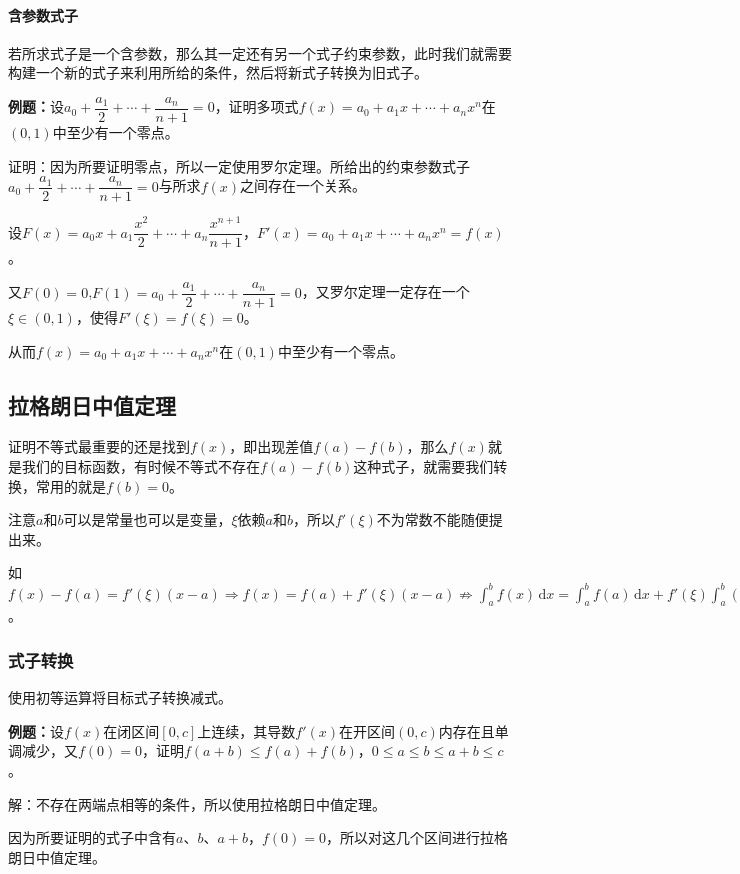 \documentclass[UTF8, 12pt]{ctexart}
\begin{document}
\paragraph{含参数式子} \leavevmode \medskip

若所求式子是一个含参数，那么其一定还有另一个式子约束参数，此时我们就需要构建一个新的式子来利用所给的条件，然后将新式子转换为旧式子。

\textbf{例题：}设$a_0+\dfrac{a_1}{2}+\cdots+\dfrac{a_n}{n+1}=0$，证明多项式$f(x)=a_0+a_1x+\cdots+a_nx^n$在$(0,1)$中至少有一个零点。

证明：因为所要证明零点，所以一定使用罗尔定理。所给出的约束参数式子$a_0+\dfrac{a_1}{2}+\cdots+\dfrac{a_n}{n+1}=0$与所求$f(x)$之间存在一个关系。

设$F(x)=a_0x+a_1\dfrac{x^2}{2}+\cdots+a_n\dfrac{x^{n+1}}{n+1}$，$F'(x)=a_0+a_1x+\cdots+a_nx^n=f(x)$。

又$F(0)=0$,$F(1)=a_0+\dfrac{a_1}{2}+\cdots+\dfrac{a_n}{n+1}=0$，又罗尔定理一定存在一个$\xi\in(0,1)$，使得$F'(\xi)=f(\xi)=0$。

从而$f(x)=a_0+a_1x+\cdots+a_nx^n$在$(0,1)$中至少有一个零点。

\subsection{拉格朗日中值定理}

证明不等式最重要的还是找到$f(x)$，即出现差值$f(a)-f(b)$，那么$f(x)$就是我们的目标函数，有时候不等式不存在$f(a)-f(b)$这种式子，就需要我们转换，常用的就是$f(b)=0$。

注意$a$和$b$可以是常量也可以是变量，$\xi$依赖$a$和$b$，所以$f'(\xi)$不为常数不能随便提出来。

如$f(x)-f(a)=f'(\xi)(x-a)\Rightarrow f(x)=f(a)+f'(\xi)(x-a)\nRightarrow\int_a^bf(x)\,\textrm{d}x=\int_a^bf(a)\,\textrm{d}x+f'(\xi)\int_a^b(x-a)\,\textrm{d}x$。

\subsubsection{式子转换}

使用初等运算将目标式子转换减式。

\textbf{例题：}设$f(x)$在闭区间$[0,c]$上连续，其导数$f'(x)$在开区间$(0,c)$内存在且单调减少，又$f(0)=0$，证明$f(a+b)\leqslant f(a)+f(b)$，$0\leqslant a\leqslant b\leqslant a+b\leqslant c$。

解：不存在两端点相等的条件，所以使用拉格朗日中值定理。

因为所要证明的式子中含有$a$、$b$、$a+b$，$f(0)=0$，所以对这几个区间进行拉格朗日中值定理。
\end{document}
